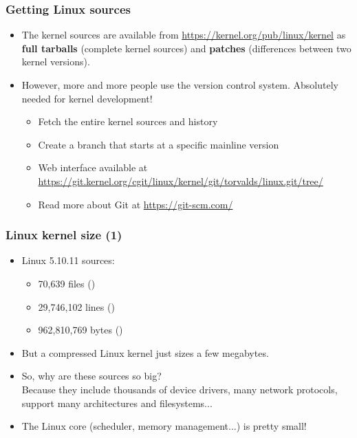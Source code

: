 \begin{frame}
  \frametitle{Getting Linux sources}
  \begin{itemize}
  \item The kernel sources are available from
    \url{https://kernel.org/pub/linux/kernel} as {\bf full tarballs}
    (complete kernel sources) and {\bf patches} (differences between
    two kernel versions).
  \item However, more and more people use the  version
    control system. Absolutely needed for kernel development!
    \begin{itemize}
    \item Fetch the entire kernel sources and history\\
      {\footnotesize
      }
    \item Create a branch that starts at a specific mainline version\\
    \item Web interface available at
      \url{https://git.kernel.org/cgit/linux/kernel/git/torvalds/linux.git/tree/}
    \item Read more about Git at \url{https://git-scm.com/}
    \end{itemize}
  \end{itemize}
\end{frame}

\begin{frame}
  \frametitle{Linux kernel size (1)}
  \begin{itemize}
  \item Linux 5.10.11 sources:\\
    \begin{itemize}
	\item 70,639 files ()
	\item 29,746,102 lines ()
	\item 962,810,769 bytes ()
    \end{itemize}
  \item But a compressed Linux kernel just sizes a few megabytes.
  \item So, why are these sources so big?\\
    Because they include thousands of device drivers, many network
    protocols, support many architectures and filesystems...
  \item The Linux core (scheduler, memory management...) is pretty
    small!
  \end{itemize}
\end{frame}

